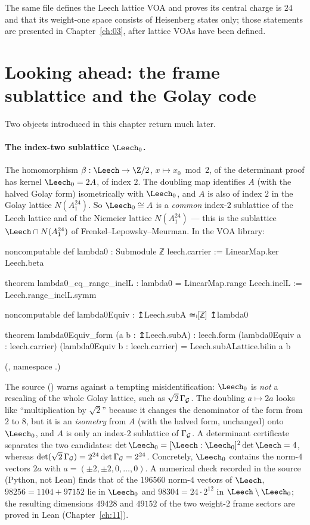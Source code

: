 The same file defines the Leech lattice VOA  and proves its central
charge is $24$ and that its weight-one space consists of Heisenberg states only; those statements
are presented in Chapter~\ref{ch:03}, after lattice VOAs have been defined.

\section{Looking ahead: the frame sublattice and the Golay code}\label{ch02:sec:ahead}

Two objects introduced in this chapter return much later.

\paragraph{The index-two sublattice $\Leech_0$.}  The homomorphism $\beta:\Leech\to\Z/2$,
$x\mapsto x_0\bmod2$, of the determinant proof has kernel $\Leech_0=2A$, of index $2$.  The
doubling map identifies $A$ (with the halved Golay form) isometrically with $\Leech_0$, and $A$ is
also of index $2$ in the Golay lattice $N(A_1^{24})$.  So $\Leech_0\cong A$ is a \emph{common}
index-$2$ sublattice of the Leech lattice and of the Niemeier lattice $N(A_1^{24})$ --- this is
the sublattice $\Leech\cap N(A_1^{24})$ of Frenkel--Lepowsky--Meurman.  In the VOA library:
\begin{leancode}
noncomputable def lambda0 : Submodule ℤ leech.carrier := LinearMap.ker Leech.beta

theorem lambda0_eq_range_inclL : lambda0 = LinearMap.range Leech.inclL := Leech.range_inclL.symm

noncomputable def lambda0Equiv : ↥Leech.subA ≃ₗ[ℤ] ↥lambda0

theorem lambda0Equiv_form (a b : ↥Leech.subA) :
    leech.form (lambda0Equiv a : leech.carrier) (lambda0Equiv b : leech.carrier)
      = Leech.subALattice.bilin a b
\end{leancode}
(, namespace .)
\begin{warning}[title={Trap: $\Leech_0$ is not $\sqrt2\,N(A_1^{24})$}]
The source () warns against a tempting misidentification:
$\Leech_0$ is \emph{not} a rescaling of the whole Golay lattice, such as $\sqrt2\,\Gamma_{\mathcal{G}}$.
The doubling $a\mapsto2a$ looks like ``multiplication by $\sqrt2$'' because it changes the
denominator of the form from $2$ to $8$, but it is an \emph{isometry} from $A$ (with the halved
form, unchanged) onto $\Leech_0$, and $A$ is only an index-$2$ sublattice of $\Gamma_{\mathcal{G}}$.  A
determinant certificate separates the two candidates: $\det\Leech_0=[\Leech:\Leech_0]^2\det\Leech=4$,
whereas $\det(\sqrt2\,\Gamma_{\mathcal{G}})=2^{24}\det\Gamma_{\mathcal{G}}=2^{24}$.  Concretely, $\Leech_0$
contains the norm-$4$ vectors $2a$ with $a=(\pm2,\pm2,0,\dots,0)$.  A numerical check recorded in the source
(Python, not Lean) finds that of the $196560$ norm-$4$ vectors of $\Leech$, $98256=1104+97152$ lie
in $\Leech_0$ and $98304=24\cdot2^{12}$ in $\Leech\setminus\Leech_0$; the resulting dimensions
$49428$ and $49152$ of the two weight-$2$ frame sectors are proved in Lean (Chapter~\ref{ch:11}).
\end{warning}
